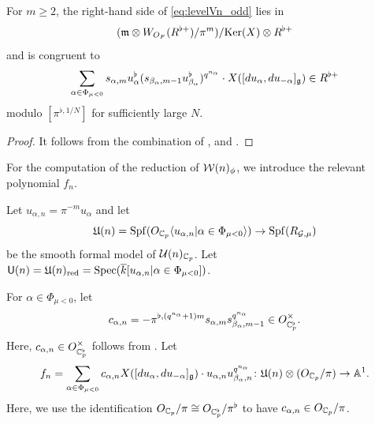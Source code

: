\documentclass[12pt,reqno]{amsart}
\begin{document}
\begin{prop} \label{prop:levelVn_odd_modulo}
    For $m \geq 2$, the right-hand side of \eqref{eq:levelVn_odd} lies in 
    \[
        ({\mathfrak{m}} \otimes W_{O_F}(R^{\flat+}) / \pi^{m}) / {\operatorname{Ker}}(X) \otimes R^{\flat +}
    \]
    and is congruent to 
    \[
        \sum_{\alpha \in \Phi_{\mu<0}} s_{\alpha,m}u_\alpha^\flat (s_{\beta_\alpha,m-1}u_{\beta_\alpha}^\flat)^{q^{n_\alpha}} \cdot X([du_\alpha, du_{-\alpha}]_{{\mathfrak{g}}}) \in R^{\flat +}
    \]
    modulo $[\pi^{\flat,1/N}]$ for sufficiently large $N$. 
\end{prop}
\begin{proof}
    It follows from the combination of ,  and . 
\end{proof}

For the computation of the reduction of ${\mathcal{W}}(n)_\phi$, we introduce the relevant polynomial $f_n$. 

\begin{defi} \label{defi:formal_model_U(n)}
    Let $u_{\alpha,n} = \pi^{-m} u_\alpha$ and let 
    \[
        {\mathfrak{U}}(n) = {\operatorname{Spf}}(O_{\mathbb{C}_p}\langle u_{\alpha, n} \vert \alpha \in \Phi_{\mu < 0} \rangle) \to {\operatorname{Spf}}(R_{{\mathcal{G}}, \mu}) 
    \]
    be the smooth formal model of ${\mathcal{U}}(n)_{\mathbb{C}_p}$. Let ${\mathsf{U}}(n) = {\mathfrak{U}}(n)_{\operatorname{red}} = {\operatorname{Spec}}({\overline{k}}[u_{\alpha, n} \vert \alpha \in \Phi_{\mu < 0}])$. 
\end{defi}

\begin{defi} \label{defi:constant_c_alpha_odd}
    For $\alpha \in \Phi_{\mu<0}$, let 
    \[
        c_{\alpha,n} = - \pi^{\flat, (q^{n_\alpha} + 1)m} s_{\alpha,m}s_{\beta_\alpha,m-1}^{q^{n_\alpha}} \in O_{\mathbb{C}_p^\flat}^\times. 
    \]
    Here, $c_{\alpha, n} \in O_{\mathbb{C}_p^\flat}^\times$ follows from . %
    Let
    \[
        f_{n} = \sum_{\alpha \in \Phi_{\mu<0}} c_{\alpha,n} X([du_\alpha, du_{-\alpha}]_{{\mathfrak{g}}}) \cdot u_{\alpha,n} u_{\beta_\alpha,n}^{q^{n_\alpha}} \colon {\mathfrak{U}}(n) \otimes (O_{\mathbb{C}_p}/\pi) \to \mathbb{A}^1. 
    \]
    Here, we use the identification $O_{\mathbb{C}_p}/\pi \cong O_{\mathbb{C}_p^\flat}/\pi^\flat$ to have $c_{\alpha, n} \in O_{\mathbb{C}_p} / \pi$. 
\end{defi}
\end{document}
